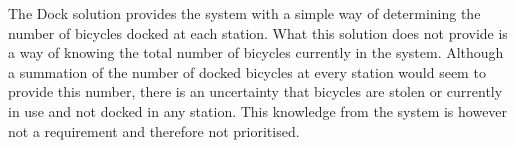 The Dock solution provides the system with a simple way of determining the number of bicycles docked at each station. What this solution does not provide is a way of knowing the total number of bicycles currently in the system. Although a summation of the number of docked bicycles at every station would seem to provide this number, there is an uncertainty that bicycles are stolen or currently in use and not docked in any station. This knowledge from the system is however not a requirement and therefore not prioritised.